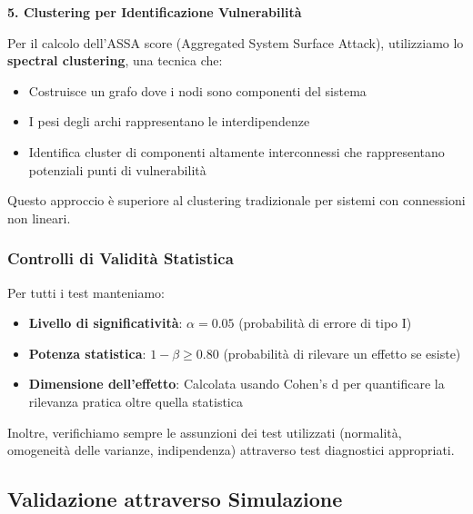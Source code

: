 \textbf{5. Clustering per Identificazione Vulnerabilità}

Per il calcolo dell'ASSA score (Aggregated System Surface Attack), utilizziamo lo \textbf{spectral clustering}, una tecnica che:
\begin{itemize}
    \item Costruisce un grafo dove i nodi sono componenti del sistema
    \item I pesi degli archi rappresentano le interdipendenze
    \item Identifica cluster di componenti altamente interconnessi che rappresentano potenziali punti di vulnerabilità
\end{itemize}

\noindent Questo approccio è superiore al clustering tradizionale per sistemi con connessioni non lineari.

\subsubsection{\texorpdfstring{\textbf{Controlli di Validità Statistica}}{1.5.3.3 Controlli di Validità Statistica}}\label{controlli-validita-statistica}

Per tutti i test manteniamo:
\begin{itemize}
    \item \textbf{Livello di significatività}: $\alpha = 0.05$ (probabilità di errore di tipo I)
    \item \textbf{Potenza statistica}: $1-\beta \geq 0.80$ (probabilità di rilevare un effetto se esiste)
    \item \textbf{Dimensione dell'effetto}: Calcolata usando Cohen's d per quantificare la rilevanza pratica oltre quella statistica
\end{itemize}

\noindent Inoltre, verifichiamo sempre le assunzioni dei test utilizzati (normalità, omogeneità delle varianze, indipendenza) attraverso test diagnostici appropriati.

\subsection{\texorpdfstring{\textbf{Validazione attraverso Simulazione}}{1.5.4 Validazione attraverso Simulazione}}\label{validazione-simulazione}

